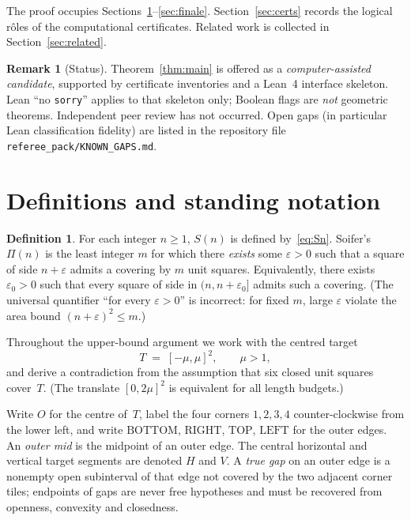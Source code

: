 \documentclass[11pt,reqno]{amsart}
\theoremstyle{definition}
\newtheorem{definition}[theorem]{Definition}
\newtheorem{remark}[theorem]{Remark}
\newcommand{\BOTTOM}{\mathrm{BOTTOM}}
\newcommand{\RIGHT}{\mathrm{RIGHT}}
\newcommand{\TOP}{\mathrm{TOP}}
\newcommand{\LEFT}{\mathrm{LEFT}}
\begin{document}
The proof occupies Sections~\ref{sec:defs}--\ref{sec:finale}.
Section~\ref{sec:certs} records the logical r\^oles of the computational
certificates.  Related work is collected in Section~\ref{sec:related}.

\begin{remark}[Status]
Theorem~\ref{thm:main} is offered as a \emph{computer-assisted candidate},
supported by certificate inventories and a Lean~4 interface skeleton.
Lean ``no \texttt{sorry}'' applies to that skeleton only; Boolean flags are
\emph{not} geometric theorems.  Independent peer review has not occurred.
Open gaps (in particular Lean classification fidelity) are listed in the
repository file \texttt{referee\_pack/KNOWN\_GAPS.md}.
\end{remark}

\section{Definitions and standing notation}\label{sec:defs}

\begin{definition}
For each integer $n\ge 1$, $S(n)$ is defined by~\eqref{eq:Sn}.
Soifer's $\Pi(n)$ is the least integer $m$ for which there \emph{exists} some
$\varepsilon>0$ such that a square of side $n+\varepsilon$ admits a covering by
$m$ unit squares.  Equivalently, there exists $\varepsilon_0>0$ such that every
square of side in $(n,n+\varepsilon_0]$ admits such a covering.
(The universal quantifier ``for every $\varepsilon>0$'' is incorrect: for fixed
$m$, large $\varepsilon$ violate the area bound $(n+\varepsilon)^2\le m$.)
\end{definition}

Throughout the upper-bound argument we work with the centred target
\begin{equation}\label{eq:M1}
T \;=\; [-\mu,\mu]^2,\qquad \mu>1,
\end{equation}
and derive a contradiction from the assumption that six closed unit squares
cover~$T$.  (The translate $[0,2\mu]^2$ is equivalent for all length budgets.)

Write $O$ for the centre of~$T$, label the four corners $1,2,3,4$
counter-clockwise from the lower left, and write $\BOTTOM$, $\RIGHT$, $\TOP$,
$\LEFT$ for the outer edges.  An \emph{outer mid} is the midpoint of an outer
edge.  The central horizontal and vertical target segments are denoted $H$ and
$V$.  A \emph{true gap} on an outer edge is a nonempty open subinterval of that
edge not covered by the two adjacent corner tiles; endpoints of gaps are never
free hypotheses and must be recovered from openness, convexity and closedness.
\end{document}
